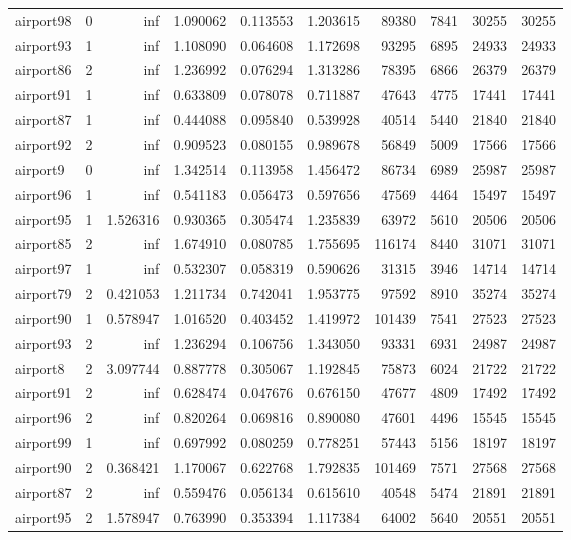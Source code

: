 \begin{longtable}{|l|r|r|r|r|r|r|r|r|r|}
airport98 & 0 & inf & 1.090062 & 0.113553 & 1.203615 & 89380 & 7841 & 30255 & 30255 \\
airport93 & 1 & inf & 1.108090 & 0.064608 & 1.172698 & 93295 & 6895 & 24933 & 24933 \\
airport86 & 2 & inf & 1.236992 & 0.076294 & 1.313286 & 78395 & 6866 & 26379 & 26379 \\
airport91 & 1 & inf & 0.633809 & 0.078078 & 0.711887 & 47643 & 4775 & 17441 & 17441 \\
airport87 & 1 & inf & 0.444088 & 0.095840 & 0.539928 & 40514 & 5440 & 21840 & 21840 \\
airport92 & 2 & inf & 0.909523 & 0.080155 & 0.989678 & 56849 & 5009 & 17566 & 17566 \\
airport9 & 0 & inf & 1.342514 & 0.113958 & 1.456472 & 86734 & 6989 & 25987 & 25987 \\
airport96 & 1 & inf & 0.541183 & 0.056473 & 0.597656 & 47569 & 4464 & 15497 & 15497 \\
airport95 & 1 & 1.526316 & 0.930365 & 0.305474 & 1.235839 & 63972 & 5610 & 20506 & 20506 \\
airport85 & 2 & inf & 1.674910 & 0.080785 & 1.755695 & 116174 & 8440 & 31071 & 31071 \\
airport97 & 1 & inf & 0.532307 & 0.058319 & 0.590626 & 31315 & 3946 & 14714 & 14714 \\
airport79 & 2 & 0.421053 & 1.211734 & 0.742041 & 1.953775 & 97592 & 8910 & 35274 & 35274 \\
airport90 & 1 & 0.578947 & 1.016520 & 0.403452 & 1.419972 & 101439 & 7541 & 27523 & 27523 \\
airport93 & 2 & inf & 1.236294 & 0.106756 & 1.343050 & 93331 & 6931 & 24987 & 24987 \\
airport8 & 2 & 3.097744 & 0.887778 & 0.305067 & 1.192845 & 75873 & 6024 & 21722 & 21722 \\
airport91 & 2 & inf & 0.628474 & 0.047676 & 0.676150 & 47677 & 4809 & 17492 & 17492 \\
airport96 & 2 & inf & 0.820264 & 0.069816 & 0.890080 & 47601 & 4496 & 15545 & 15545 \\
airport99 & 1 & inf & 0.697992 & 0.080259 & 0.778251 & 57443 & 5156 & 18197 & 18197 \\
airport90 & 2 & 0.368421 & 1.170067 & 0.622768 & 1.792835 & 101469 & 7571 & 27568 & 27568 \\
airport87 & 2 & inf & 0.559476 & 0.056134 & 0.615610 & 40548 & 5474 & 21891 & 21891 \\
airport95 & 2 & 1.578947 & 0.763990 & 0.353394 & 1.117384 & 64002 & 5640 & 20551 & 20551 \\

\end{longtable}
